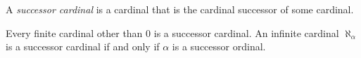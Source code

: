 \documentclass[12pt]{article}
\begin{document}
A {\em successor cardinal} is a cardinal that is the cardinal successor of some cardinal.

Every finite cardinal other than $0$ is a successor cardinal.
An infinite cardinal $\aleph_\alpha$ is a successor cardinal if and only if $\alpha$ is a successor ordinal.
\end{document}
